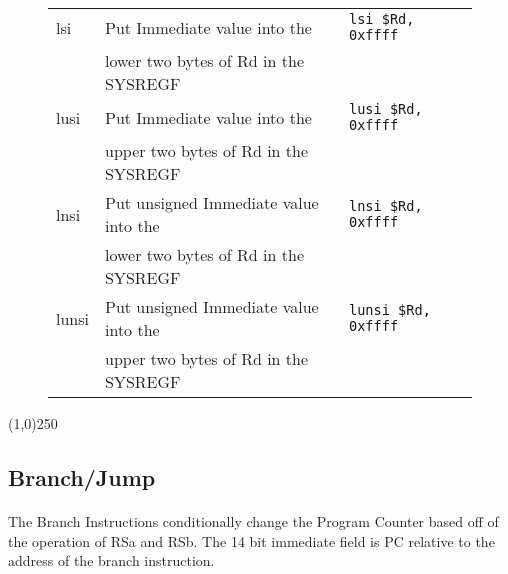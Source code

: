 \documentclass[letterpaper, 11pt]{article}
\begin{document}
\begin{figure}[!h]
\begin{center}
\begin{tabular}{|l|l|l|}
			lsi					& Put Immediate value into the 				& \texttt{lsi \$Rd, 0xffff}		\\ 
			\hfill				& lower two bytes of Rd in the SYSREGF		& \hfill 						\\ \hline
			lusi				& Put Immediate value into the 				& \texttt{lusi \$Rd, 0xffff}	\\ 
			\hfill				& upper two bytes of Rd in the SYSREGF		& \hfill						\\ \hline
			lnsi				& Put unsigned Immediate value into the 	& \texttt{lnsi \$Rd, 0xffff}	\\ 
			\hfill				& lower two bytes of Rd in the SYSREGF		& \hfill 						\\ \hline
			lunsi				& Put unsigned Immediate value into the 	& \texttt{lunsi \$Rd, 0xffff}	\\ 
			\hfill				& upper two bytes of Rd in the SYSREGF		& \hfill						\\ \hline			
		\end{tabular} 
	\end{center}
	
\end{figure}

\begin{center}
	\line(1,0){250}
\end{center}
 
 \newpage
\subsection{Branch/Jump}
\paragraph{} The Branch Instructions conditionally change the Program Counter based off of the operation of RSa and RSb. The 14 bit
immediate field is PC relative to the address of the branch instruction.
\end{document}
